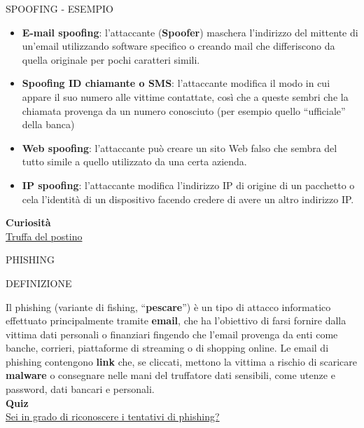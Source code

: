 \documentclass[aspectratio=1610, handout]{beamer}
\begin{document}
\begin{frame}{SPOOFING - ESEMPIO}
    \begin{itemize}
        \item \textbf{E-mail spoofing}: l'attaccante (\textbf{Spoofer}) maschera l'indirizzo del mittente di un'email 
        utilizzando software specifico o creando mail che differiscono da quella originale per 
        pochi caratteri simili.
        \pause
        \item \textbf{Spoofing ID chiamante o SMS}: l'attaccante modifica il modo in cui appare il suo 
        numero alle vittime contattate, così che a queste sembri che la chiamata provenga da un numero 
        conosciuto (per esempio quello ``ufficiale'' della banca)
        \pause
        \item \textbf{Web spoofing}: l'attaccante può creare un sito Web falso che 
        sembra del tutto simile a quello utilizzato da una certa azienda.
        \pause
        \item \textbf{IP spoofing}: l'attaccante modifica l'indirizzo IP di origine di un pacchetto o 
        cela l'identità di un dispositivo facendo credere di avere un altro indirizzo IP. 
    \end{itemize}
    \tiny{\textbf{Curiosità}}\\
    \tiny{\href{https://www.geopop.it/una-lettera-contenente-un-qr-code-puo-svuotarvi-il-conto-come-riconoscere-la-truffa-del-postino/}{Truffa del postino}}
\end{frame}

\begin{frame}{PHISHING}
    \begin{alertblock}{DEFINIZIONE}
        \begin{minipage}{0.98\linewidth}
            \justifying
            Il phishing (variante di fishing, ``\textbf{pescare}'') è un tipo di attacco informatico effettuato principalmente tramite \textbf{email}, 
            che ha l'obiettivo di farsi fornire dalla vittima dati personali o finanziari fingendo che 
            l'email provenga da enti come banche, corrieri, piattaforme di streaming o di shopping online. 
            Le email di phishing contengono \textbf{link} che, se cliccati, mettono la vittima a rischio di scaricare 
            \textbf{malware} o consegnare nelle mani del truffatore dati sensibili, come utenze e password, dati bancari 
            e personali.\\
            \bigskip
            \tiny{\textbf{Quiz}}\\
            \tiny{\href{https://phishingquiz.withgoogle.com/}{Sei in grado di riconoscere i tentativi di phishing?}}
        \end{minipage}
    \end{alertblock}
\end{frame}
\end{document}
